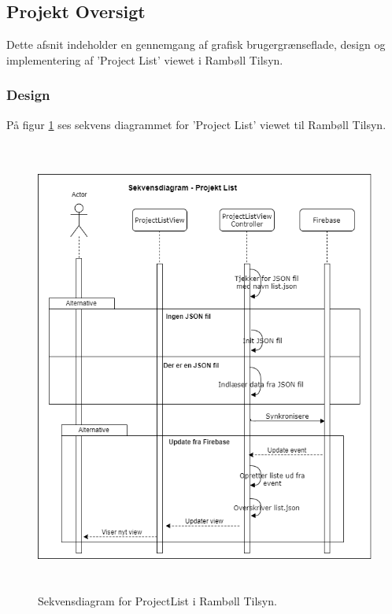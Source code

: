 \subsection{Projekt Oversigt} \label{sec:ProjectList}
Dette afsnit indeholder en gennemgang af grafisk brugergrænseflade, design og implementering af 'Project List' viewet i Rambøll Tilsyn.

\subsubsection{Design}
På figur \ref{fig:ProjctListSekvens} ses sekvens diagrammet for 'Project List' viewet til Rambøll Tilsyn.
\begin{figure}[H] %
	\centering
	\includegraphics[height=15cm, width=15cm]{../ArkitekturDesign/Design/ProjectList/ProjektListSekvensDiagram}
	\caption{Sekvensdiagram for ProjectList i Rambøll Tilsyn.}
	\label{fig:ProjctListSekvens}
\end{figure}

\clearpage


